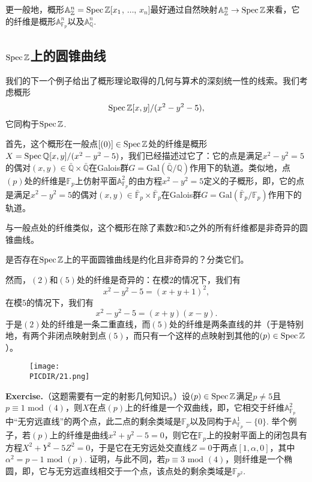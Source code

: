 更一般地，概形$\mathbb{A}_{\mathbb{Z}}^n=\operatorname{Spec} \mathbb{Z}[x_1$, $\dots$, $x_n]$最好通过自然映射$\mathbb{A}_{\mathbb{Z}}^n\to\operatorname{Spec} \mathbb{Z}$来看，它的纤维是概形$\mathbb{A}_{\mathbb{F}_p}^n$以及$\mathbb{A}_{\mathbb{Q}}^n$.

\subsection{\texorpdfstring{$\operatorname{Spec} \mathbb{Z}$}{Spec Z}上的圆锥曲线}\label{s:2.4.4}

我们的下一个例子给出了概形理论取得的几何与算术的深刻统一性的线索。我们考虑概形
\[
	\operatorname{Spec} \mathbb{Z}[x,y]/(x^2-y^2-5),
\]
它同构于$\operatorname{Spec} \mathbb{Z}$.

首先，这个概形在一般点$[(0)]\in \operatorname{Spec} \mathbb{Z}$处的纤维是概形$X=\operatorname{Spec} \mathbb{Q}[x,y]/(x^2-y^2-5)$，我们已经描述过它了：它的点是满足$x^2-y^2=5$的偶对$(x,y)\in \bar{\mathbb{Q}}\times \bar{\mathbb{Q}}$在Galois群$G=\mathrm{Gal}(\bar{\mathbb{Q}}/\mathbb{Q})$作用下的轨道。类似地，点$(p)$处的纤维是$\mathbb{F}_p$上仿射平面$\mathbb{A}_{\mathbb{F}_p}^2$的由方程$x^2-y^2=5$定义的子概形，即，它的点是满足$x^2-y^2=5$的偶对$(x,y)\in \bar{\mathbb{F}}_p\times \bar{\mathbb{F}}_p$在Galois群$G=\mathrm{Gal}(\bar{\mathbb{F}}_p/\mathbb{F}_p)$作用下的轨道。

与一般点处的纤维类似，这个概形在除了素数$2$和$5$之外的所有纤维都是非奇异的圆锥曲线。

\begin{exe}
	是否存在$\operatorname{Spec} \mathbb{Z}$上的平面圆锥曲线是约化且非奇异的？分类它们。
\end{exe}

然而，$(2)$和$(5)$处的纤维是奇异的：在模$2$的情况下，我们有
\[
	x^2-y^2-5=(x+y+1)^2,
\]
在模$5$的情况下，我们有
\[
	x^2-y^2-5=(x+y)(x-y).
\]
于是$(2)$处的纤维是一条二重直线，而$(5)$处的纤维是两条直线的并（于是特别地，有两个非闭点映射到点$(5)$，而只有一个这样的点映射到其他的$(p)\in \operatorname{Spec} \mathbb{Z}$）。


\begin{wrapfigure}{r}{160pt}
\texttt{[image: \\PICDIR/21.png]}
\end{wrapfigure}
\noindent\textbf{Exercise\hspace{0.38em}{\addtocounter{thm}{1}}\thethm.}（这题需要有一定的射影几何知识。）设$(p)\in\operatorname{Spec}\mathbb{Z}$满足$p\neq 5$且$p\equiv 1\text{ mod } (4)$，则$X$在点$(p)$上的纤维是一个双曲线，即，它相交于纤维$\mathbb{A}_{\mathbb{F}_p}^2$中“无穷远直线”的两个点，此二点的剩余类域是$\mathbb{F}_p$以及同构于$\mathbb{A}_{\mathbb{F}_p}^1-\{0\}$. 举个例子，若$(p)$上的纤维是曲线$x^2+y^2-5=0$，则它在$\mathbb{F}_p$上的投射平面上的闭包具有方程$X^2+Y^2-5Z^2=0$，于是它在无穷远处交直线$Z=0$于两点$[1,\alpha,0]$，其中$\alpha^2=p-1\text{ mod } (p)$. 证明，与此不同，若$p\equiv 3\text{ mod } (4)$，则纤维是一个椭圆，即，它与无穷远直线相交于一个点，该点处的剩余类域是$\mathbb{F}_{p^2}$. \vspace{0.5em}

